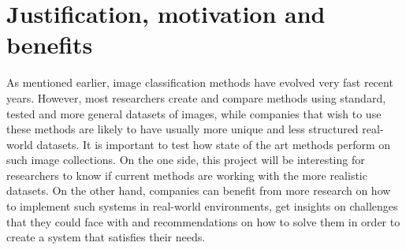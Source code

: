 

\section{Justification, motivation and benefits}
As mentioned earlier, image classification methods have evolved very fast recent years. However, most researchers create and compare methods using standard, tested and more general datasets of images, while companies that wish to use these methods are likely to have usually more unique and less structured real-world datasets. It is important to test how state of the art methods perform on such image collections. On the one side, this project will be interesting for researchers to know if current methods are working with the more realistic datasets. On the other hand, companies can benefit from more research on how to implement such systems in real-world environments, get insights on challenges that they could face with and recommendations on how to solve them in order to create a system that satisfies their needs.


